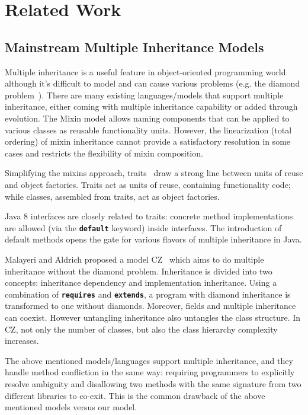 \section{Related Work}

\subsection{Mainstream Multiple Inheritance Models}
Multiple inheritance is a useful feature in object-oriented programming world although it's difficult to model and can 
cause various problems (e.g. the diamond problem~\cite{Sak89dis,Singh1995}).  There are many existing languages/models that support multiple 
inheritance, either coming with multiple inheritance capability or added through evolution. The Mixin model allows naming components 
that can be applied to various classes as reusable functionality units. However, the linearization (total ordering) of mixin 
inheritance cannot provide a satisfactory resolution in some cases and restricts the flexibility of mixin composition. 

Simplifying the mixins approach, traits~\cite{scharli03traits} draw a strong line between units of reuse and object factories. 
Traits act as units of reuse, containing functionality code; while classes, assembled from traits, act as object factories. 

Java 8 interfaces are closely related to traits: concrete method implementations are allowed (via the \textbf{\texttt{default}} keyword) inside interfaces. 
The introduction of default methods opens the gate for various flavors of multiple inheritance in Java.

Malayeri and Aldrich proposed a model CZ~\cite{malayeri2009cz} which aims to do multiple inheritance without the diamond problem. 
Inheritance is divided into two concepts: inheritance dependency and implementation inheritance. 
Using a combination of \textbf{\texttt{requires}} and \textbf{\texttt{extends}}, a program with 
diamond inheritance is transformed to one without diamonds. Moreover, fields and multiple inheritance can coexist. 
However untangling inheritance also untangles the class structure. In CZ, not only the number of classes, but also 
the class hierarchy complexity increases. 

The above mentioned models/languages support multiple inheritance, and they handle method confliction in the same way: requiring 
programmers to explicitly resolve ambiguity and disallowing two methods with the same signature from two different libraries 
to co-exit. This is the common drawback of the above mentioned models versus our model.

